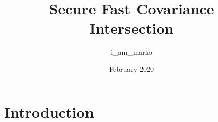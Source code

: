 \documentclass{article}
\title{Secure Fast Covariance Intersection}
\author{i_am_marko }
\date{February 2020}
\begin{document}
\maketitle

\section{Introduction}
\end{document}
